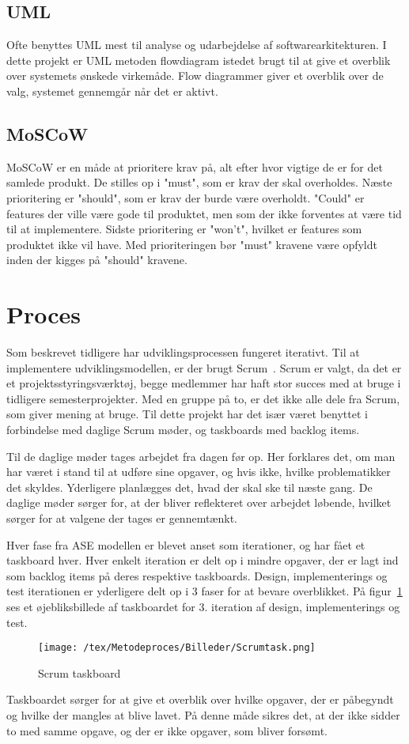 \subsection{UML}
Ofte benyttes UML mest til analyse og udarbejdelse af softwarearkitekturen. I dette projekt er UML metoden flowdiagram istedet brugt til at give et overblik over systemets ønskede virkemåde. Flow diagrammer giver et overblik over de valg, systemet gennemgår når det er aktivt.   

\subsection{MoSCoW} 
MoSCoW er en måde at prioritere krav på, alt efter hvor vigtige de er for det samlede produkt.  
De stilles op i "must", som er krav der skal overholdes. Næste prioritering er "should", som er krav der burde være overholdt. "Could" er features der ville være gode til produktet, men som der ikke forventes at være tid til at implementere. Sidste prioritering er "won't", hvilket er features som produktet ikke vil have. Med prioriteringen bør "must" kravene være opfyldt inden der kigges på "should" kravene. 

\section{Proces}
Som beskrevet tidligere har udviklingsprocessen fungeret iterativt. Til at implementere udviklingsmodellen, er der brugt Scrum~\cite{Scrum}. Scrum er valgt, da det er et projektsstyringsværktøj, begge medlemmer har haft stor succes med at bruge i tidligere semesterprojekter. Med en gruppe på to, er det ikke alle dele fra Scrum, som giver mening at bruge. Til dette projekt har det især været benyttet i forbindelse med daglige Scrum møder, og taskboards med backlog items. 

Til de daglige møder tages arbejdet fra dagen før op. Her forklares det, om man har været i stand til at udføre sine opgaver, og hvis ikke, hvilke problematikker det skyldes. Yderligere planlægges det, hvad der skal ske til næste gang. De daglige møder sørger for, at der bliver reflekteret over arbejdet løbende, hvilket sørger for at valgene der tages er gennemtænkt. 

Hver fase fra ASE modellen er blevet anset som iterationer, og har fået et taskboard hver. Hver enkelt iteration er delt op i mindre opgaver, der er lagt ind som backlog items på deres respektive taskboards. Design, implementerings og test iterationen er yderligere delt op i 3 faser for at bevare overblikket. På figur~\ref{fig:Taskboard} ses et øjebliksbillede af taskboardet for 3. iteration af design, implementerings og test.
\begin{figure}[H]
	\center
	\texttt{[image: /tex/Metodeproces/Billeder/Scrumtask.png]}
	\caption{Scrum taskboard}
	\label{fig:Taskboard}
\end{figure}        
Taskboardet sørger for at give et overblik over hvilke opgaver, der er påbegyndt og hvilke der mangles at blive lavet. På denne måde sikres det, at der ikke sidder to med samme opgave, og der er ikke opgaver, som bliver forsømt.

